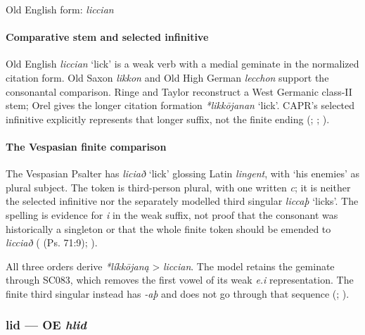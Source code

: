 \documentclass[
  british,
  a4paper,
]{article}
\providecommand{\Recon}[1]{\emph{*#1}}
\begin{document}
Old English form: \emph{liccian}

\paragraph{Comparative stem and selected
infinitive}\label{comparative-stem-and-selected-infinitive}

Old English {\emph{liccian}} `lick' is a weak verb with a medial
geminate in the normalized citation form. Old Saxon \emph{likkon} and
Old High German \emph{lecchon} support the consonantal comparison. Ringe
and Taylor reconstruct a West Germanic class-II stem; Orel gives the
longer citation formation \Recon{likkōjanan} `lick'. CAPR's selected
infinitive explicitly represents that longer suffix, not the finite
ending (;
;
).

\paragraph{The Vespasian finite
comparison}\label{the-vespasian-finite-comparison}

The Vespasian Psalter has {\emph{liciað}} `lick' glossing Latin
\emph{lingent}, with `his enemies' as plural subject. The token is
third-person plural, with one written \emph{c}; it is neither the
selected infinitive nor the separately modelled third singular
\emph{liccaþ} `licks'. The spelling is evidence for \emph{i} in the weak
suffix, not proof that the consonant was historically a singleton or
that the whole finite token should be emended to \emph{licciað}
( (Ps. 71:9);
).

All three orders derive \emph{*líkkōjaną} \textgreater{} \emph{liccian}.
The model retains the geminate through SC083, which removes the first
vowel of its weak \emph{e.i} representation. The finite third singular
instead has \emph{-aþ} and does not go through that sequence
(;
).

\subsubsection{\texorpdfstring{lid --- OE
\emph{hlid}}{lid --- OE hlid}}\label{lid-oe-hlid}
\end{document}
